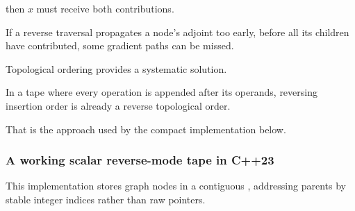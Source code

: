 then \(x\) must receive both contributions.

If a reverse traversal propagates a node's adjoint too early, before all its children have contributed, some gradient paths can be missed.

Topological ordering provides a systematic solution.

In a tape where every operation is appended after its operands, reversing insertion order is already a reverse topological order.

That is the approach used by the compact implementation below.

\subsubsection{A working scalar reverse-mode tape in C++23}\label{02-foundations-ii-ch022-a-working-scalar-reverse-mode-tape-in-c23}

\hypertarget{02-foundations-ii-ch022-a-working-scalar-reverse-mode-tape-in-c23}{}

This implementation stores graph nodes in a contiguous , addressing parents by stable integer indices rather than raw pointers.

